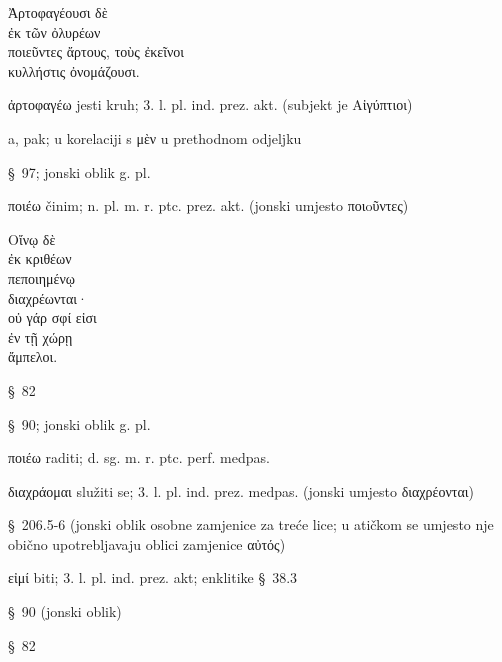 
{\large
\begin{greek}
\noindent Ἀρτοφαγέουσι δὲ \\
\tabto{2em} ἐκ τῶν ὀλυρέων \\
\tabto{4em} ποιεῦντες ἄρτους,
\tabto{6em} τοὺς ἐκεῖνοι \\
\tabto{6em} κυλλήστις ὀνομάζουσι.\\

\end{greek}
}

\begin{description}[noitemsep]
\item[Ἀρτοφαγέουσι] ἀρτοφαγέω jesti kruh; 3. l. pl. ind. prez. akt. (subjekt je \textgreek[variant=ancient]{Αἰγύπτιοι)}
\item[δὲ] a, pak; u korelaciji s μὲν u prethodnom odjeljku
\item[ἐκ τῶν ὀλυρέων] §~97; jonski oblik g. pl.
\item[ποιεῦντες] ποιέω činim; n. pl. m. r. ptc. prez. akt. (jonski umjesto \textgreek[variant=ancient]{ποιoῦντες)}

\end{description}


{\large
\begin{greek}
\noindent Οἴνῳ δὲ \\
\tabto{2em} ἐκ κριθέων \\
πεποιημένῳ \\
διαχρέωνται·\\
οὐ γάρ σφί εἰσι \\
\tabto{2em} ἐν τῇ χώρῃ \\
ἄμπελοι.\\

\end{greek}
}

\begin{description}[noitemsep]
\item[Οἴνῳ] §~82
\item[ἐκ κριθέων] §~90; jonski oblik g. pl.
\item[πεποιημένῳ] ποιέω raditi; d. sg. m. r. ptc. perf. medpas.
\item[διαχρέωνται] διαχράομαι služiti se; 3. l. pl. ind. prez. medpas. (jonski umjesto \textgreek[variant=ancient]{διαχρέονται)}
\item[σφί] §~206.5-6 (jonski oblik osobne zamjenice za treće lice; u atičkom se umjesto nje obično upotrebljavaju oblici zamjenice αὐτός)
\item[εἰσι] εἰμί biti; 3. l. pl. ind. prez. akt; enklitike §~38.3 
\item[ἐν τῇ χώρῃ] §~90 (jonski oblik)
\item[ἄμπελοι] §~82

\end{description}


